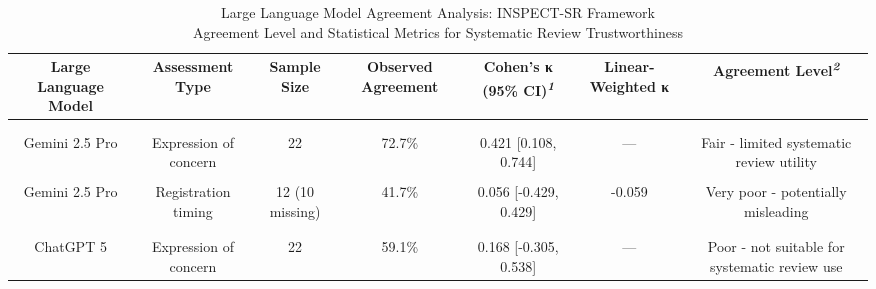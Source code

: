 \begin{table}[t]
\caption*{
{\large Large Language Model Agreement Analysis: INSPECT-SR Framework} \\ 
{\small Agreement Level and Statistical Metrics for Systematic Review Trustworthiness}
} 
\fontsize{13.5pt}{16.2pt}\selectfont
\begin{tabular*}{\linewidth}{@{\extracolsep{\fill}}ccccccc}
\toprule
Large Language Model & Assessment Type & Sample Size & Observed Agreement & Cohen's κ (95\% CI)\textsuperscript{\textit{1}} & {\bfseries \textcolor[HTML]{2E86AB}{Linear-Weighted κ}} & Agreement Level\textsuperscript{\textit{2}} \\ 
\midrule\addlinespace[2.5pt]
\multicolumn{7}{l}{{\bfseries \cellcolor[HTML]{2E86AB}{\textcolor[HTML]{FFFFFF}{Gemini 2.5 Pro}}}} \\[2.5pt] 
\midrule\addlinespace[2.5pt]
{\cellcolor[HTML]{F7F7F7}{Gemini 2.5 Pro}} & {\cellcolor[HTML]{F7F7F7}{Retraction}} & {\cellcolor[HTML]{F7F7F7}{22}} & {\cellcolor[HTML]{F7F7F7}{81.8\%}} & {\cellcolor[HTML]{F7F7F7}{0.241 [-0.122, 1.000]}} & {\cellcolor[HTML]{F7F7F7}{—}} & {\cellcolor[HTML]{F7F7F7}{Poor - not suitable for systematic review use}} \\ 
Gemini 2.5 Pro & Expression of concern & 22 & 72.7\% & 0.421 [0.108, 0.744] & — & Fair - limited systematic review utility \\ 
{\cellcolor[HTML]{F7F7F7}{Gemini 2.5 Pro}} & {\cellcolor[HTML]{F7F7F7}{Team integrity}} & {\cellcolor[HTML]{F7F7F7}{22}} & {\cellcolor[HTML]{F7F7F7}{59.1\%}} & {\cellcolor[HTML]{F7F7F7}{0.182 [-0.299, 0.530]}} & {\cellcolor[HTML]{F7F7F7}{0.182}} & {\cellcolor[HTML]{F7F7F7}{Poor - not suitable for systematic review use}} \\ 
{Gemini 2.5 Pro} & {Registration timing} & {12 (10 missing)} & {41.7\%} & {0.056 [-0.429, 0.429]} & {-0.059} & {Very poor - potentially misleading} \\ 
\midrule\addlinespace[2.5pt]
\multicolumn{7}{l}{{\bfseries \cellcolor[HTML]{2E86AB}{\textcolor[HTML]{FFFFFF}{ChatGPT 5}}}} \\[2.5pt] 
\midrule\addlinespace[2.5pt]
{\cellcolor[HTML]{F7F7F7}{ChatGPT 5}} & {\cellcolor[HTML]{F7F7F7}{Retraction}} & {\cellcolor[HTML]{F7F7F7}{22}} & {\cellcolor[HTML]{F7F7F7}{86.4\%}} & {\cellcolor[HTML]{F7F7F7}{0.492 [-0.078, 1.000]}} & {\cellcolor[HTML]{F7F7F7}{—}} & {\cellcolor[HTML]{F7F7F7}{Fair - limited systematic review utility}} \\ 
ChatGPT 5 & Expression of concern & 22 & 59.1\% & 0.168 [-0.305, 0.538] & — & Poor - not suitable for systematic review use \\ 

\end{tabular*}
\end{table}
